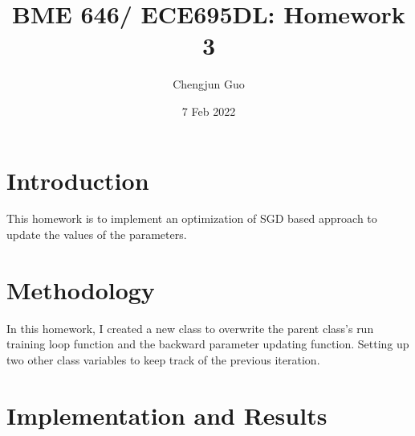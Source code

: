 \documentclass{article}
\title{BME 646/ ECE695DL: Homework 3}
\author{Chengjun Guo}
\date{7 Feb 2022}
\begin{document}
\maketitle
\section{Introduction}
This homework is to implement an optimization of SGD based approach to update the values of the parameters.
\section{Methodology}
In this homework, I created a new class to overwrite the parent class's run training loop function and the backward parameter updating function. Setting up two other class variables to keep track of the previous iteration.

\section{Implementation and Results}
\end{document}
